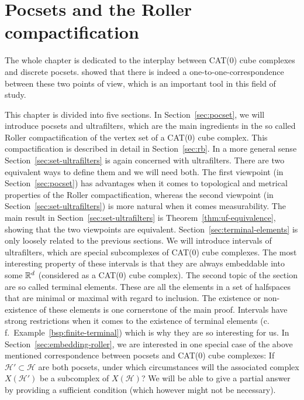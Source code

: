 \section{Pocsets and the Roller compactification}
\label{sec:roller}
The whole chapter is dedicated to the interplay between CAT(0) cube complexes and discrete pocsets. \textcite{Roller1999} showed that there is indeed a one-to-one-correspondence between these two points of view, which is an important tool in this field of study.

This chapter is divided into five sections. In Section~\ref{sec:pocset}, we will introduce pocsets and ultrafilters, which are the main ingredients in the so called Roller compactification of the vertex set of a CAT(0) cube complex. This compactification is described in detail in Section~\ref{sec:rb}. In a more general sense 
Section~\ref{sec:set-ultrafilters} is again concerned with ultrafilters. There are two equivalent ways to define them and we will need both. The first viewpoint (in Section~\ref{sec:pocset}) has advantages when it comes to topological and metrical properties of the Roller compactification, whereas the second viewpoint (in Section~\ref{sec:set-ultrafilters}) is more natural when it comes measurability. The main result in Section~\ref{sec:set-ultrafilters} is Theorem~\ref{thm:uf-equivalence}, showing that the two viewpoints are equivalent.
Section~\ref{sec:terminal-elements} is only loosely related to the previous sections. We will introduce intervals of ultrafilters, which are special subcomplexes of CAT(0) cube complexes. The most interesting property of these intervals is that they are always embeddable into some \(\mathbb{R}^d\) (considered as a CAT(0) cube complex). The second topic of the section are so called terminal elements. These are all the elements in a set of halfspaces that are minimal or maximal with regard to inclusion. The existence or non-existence of these elements is one cornerstone of the main proof. Intervals have strong restrictions when it comes to the existence of terminal elements (c.\,f.\ Example~\ref{bsp:finite-terminal}) which is why they are so interesting for us.
In Section~\ref{sec:embedding-roller}, we are interested in one special case of the above mentioned correspondence between pocsets and CAT(0) cube complexes: If \(\mathcal{H'} \subset \mathcal{H}\) are both pocsets, under which circumstances will the associated complex \(X(\mathcal{H}')\) be a subcomplex of \(X(\mathcal{H})\)? We will be able to give a partial answer by providing a sufficient condition (which however might not be necessary).

